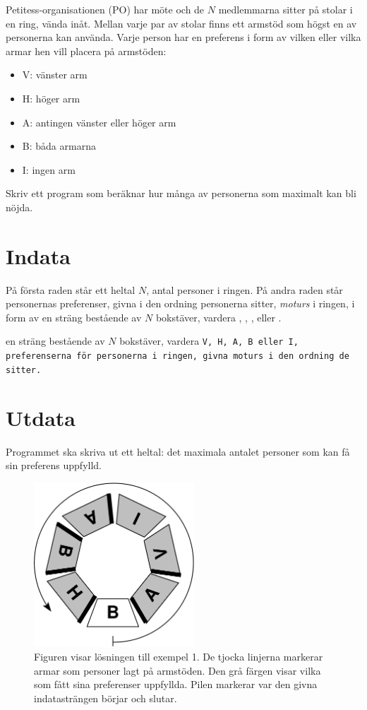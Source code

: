 
Petitess-organisationen (PO) har möte och de $N$ medlemmarna sitter på
stolar i en ring, vända inåt. Mellan varje par av stolar finns ett armstöd som högst en av personerna kan använda. Varje person har en preferens i form av vilken eller vilka armar hen vill placera på armstöden:
\begin{itemize}
\item V: vänster arm
\item H: höger arm
\item A: antingen vänster eller höger arm
\item B: båda armarna
\item I: ingen arm
\end{itemize}

Skriv ett program som beräknar hur många av personerna som maximalt kan bli nöjda.

\section*{Indata}
På första raden står ett heltal $N$, antal personer i ringen. På andra raden står personernas preferenser, givna i den ordning
personerna sitter, {\em moturs} i ringen, i form av en
sträng bestående av $N$ bokstäver, vardera , ,
,  eller . 

en sträng bestående av $N$ bokstäver, vardera \tt{V}, \tt{H}, \tt{A}, \tt{B} eller \tt{I}, preferenserna för personerna i ringen, givna moturs i den ordning de sitter.

\section*{Utdata}
Programmet ska skriva ut ett heltal: det maximala antalet personer som kan få sin preferens uppfylld.

\begin{figure}
\begin{center}
\includegraphics[width=6cm]{armstodbild.pdf}
\end{center}
\caption{Figuren visar lösningen till exempel 1. De tjocka linjerna markerar
armar som personer lagt på armstöden. Den grå färgen visar vilka som fått sina preferenser uppfyllda. Pilen markerar var den givna
indatasträngen börjar och slutar.}
\end{figure}

